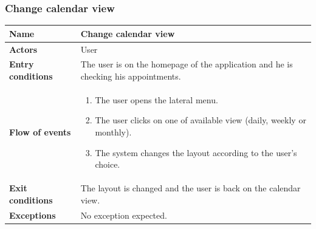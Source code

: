 \subsubsection{Change calendar view}
\begin{table}[!h]
	\centering
	{\renewcommand{\arraystretch}{2}%
		\begin{tabular}{|l|p{12cm}|}
			\hline
			\textbf{Name} 				& \textbf{Change calendar view} \\ \hline
			\textbf{Actors} 			& User \\ \hline
			\textbf{Entry conditions} 	& The user is on the homepage of the application and he is checking his appointments. \\ \hline
			\textbf{Flow of events}		& \begin{minipage}[t]{0.75\textwidth}
				\begin{enumerate}
					\item The user opens the lateral menu.
					\item The user clicks on one of available view (daily, weekly or monthly).
					\item The system changes the layout according to the user’s choice. 
				\end{enumerate}
			\end{minipage}	\\ \hline
			\textbf{Exit conditions}	& The layout is changed and the user is back on the calendar view.  \\ \hline
			\textbf{Exceptions}			& No exception expected.  \\ \hline
	\end{tabular}}
\end{table}

